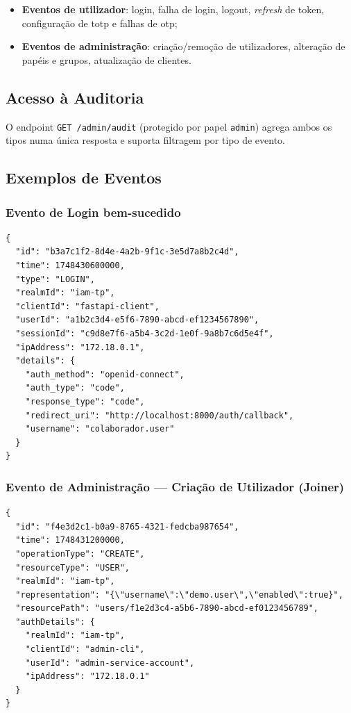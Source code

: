 \begin{itemize}
  \item \textbf{Eventos de utilizador}: login, falha de login, logout, \textit{refresh} de token, configuração de \gls{totp} e falhas de \gls{otp};
  
  \item \textbf{Eventos de administração}: criação/remoção de utilizadores, alteração de papéis e grupos, atualização de clientes.
\end{itemize}

\subsection{Acesso à Auditoria}

O endpoint \texttt{GET /admin/audit} (protegido por papel \texttt{admin}) agrega ambos os tipos numa única resposta e suporta filtragem por tipo de evento.

\subsection{Exemplos de Eventos}

\subsubsection{Evento de Login bem-sucedido}

\begin{lstlisting}[caption={Excerto de evento de auditoria — login bem-sucedido},label={lst:audit_evento}]
{
  "id": "b3a7c1f2-8d4e-4a2b-9f1c-3e5d7a8b2c4d",
  "time": 1748430600000,
  "type": "LOGIN",
  "realmId": "iam-tp",
  "clientId": "fastapi-client",
  "userId": "a1b2c3d4-e5f6-7890-abcd-ef1234567890",
  "sessionId": "c9d8e7f6-a5b4-3c2d-1e0f-9a8b7c6d5e4f",
  "ipAddress": "172.18.0.1",
  "details": {
    "auth_method": "openid-connect",
    "auth_type": "code",
    "response_type": "code",
    "redirect_uri": "http://localhost:8000/auth/callback",
    "username": "colaborador.user"
  }
}
\end{lstlisting}

\subsubsection{Evento de Administração — Criação de Utilizador (Joiner)}

\begin{lstlisting}[caption={Excerto de evento de administração — criação de utilizador (Joiner)},label={lst:audit_admin}]
{
  "id": "f4e3d2c1-b0a9-8765-4321-fedcba987654",
  "time": 1748431200000,
  "operationType": "CREATE",
  "resourceType": "USER",
  "realmId": "iam-tp",
  "representation": "{\"username\":\"demo.user\",\"enabled\":true}",
  "resourcePath": "users/f1e2d3c4-a5b6-7890-abcd-ef0123456789",
  "authDetails": {
    "realmId": "iam-tp",
    "clientId": "admin-cli",
    "userId": "admin-service-account",
    "ipAddress": "172.18.0.1"
  }
}
\end{lstlisting}

